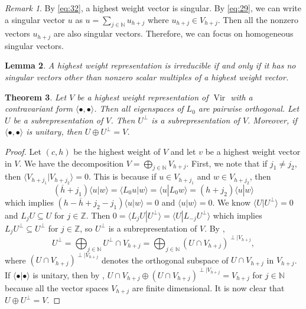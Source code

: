 \documentclass[a4paper, 12pt, reqno]{amsart}
\newtheorem{theorem}{Theorem}[subsection]
\newtheorem{lemma}[theorem]{Lemma}
\theoremstyle{remark}
\newtheorem{remark}[theorem]{Remark}
\numberwithin{equation}{subsection}
\DeclareMathOperator{\Vir}{Vir}
\begin{document}
\begin{remark}
  \label{rmk:22}
  By \eqref{eq:32}, a highest weight vector is singular. 
  By \eqref{eq:29}, we can  write a singular vector $u$ as $u = \sum_{j \in \mathbb{N}}u_{h + j}$ where $u_{h + j} \in V_{h + j}$.
  Then all the nonzero vectors $u_{h + j}$ are also singular vectors.
  Therefore, we can focus on homogeneous singular vectors.
\end{remark}

\begin{lemma}
  \label{lmm:11}
  A highest weight representation is irreducible if and only if it has no singular vectors other than nonzero scalar multiples of a highest weight vector.
\end{lemma}

\begin{theorem}
  \label{thr:24}
  Let $V$ be a highest weight representation of $\Vir$ with a contravariant form $\langle \bullet, \bullet\rangle$.
  Then all eigenspaces of $L_0$ are pairwise orthogonal.
  Let $U$ be a subrepresentation of $V$.
  Then $U^\perp$ is a subrepresentation of $V$.
  Moreover, if $\langle \bullet, \bullet\rangle$ is unitary, then $U\oplus U^\perp=V$.
\end{theorem}

\begin{proof}
  Let $(c, h)$ be the highest weight of $V$ and let $v$ be a highest weight vector in $V$.
  We have the decomposition $V = \bigoplus_{j \in \mathbb{N}}V_{h + j}$.
  First, we note that if $j_1 \neq j_2$, then $\langle V_{h + j_1}| V_{h + j_2}\rangle = 0$.
  This is because if $u \in V_{h + j_1}$ and $w \in V_{h + j_2}$, then
  \begin{equation*}
    (\overline{h} + j_1)\langle u| w\rangle = \langle L_0u| w\rangle = \langle u| L_0w\rangle = (h + j_2)\langle u| w\rangle
  \end{equation*}
  which implies $(h - \overline{h} + j_2 - j_1)\langle u| w\rangle = 0$ and $\langle u| w\rangle = 0$.
  We know $\langle U| U^{\perp}\rangle = 0$ and $L_jU \subseteq U$ for $j \in \mathbb{Z}$.
  Then $0 = \langle L_jU| U^{\perp}\rangle = \langle U| L_{-j}U^{\perp}\rangle$ which implies $L_jU^{\perp} \subseteq U^{\perp}$ for $j \in \mathbb{Z}$, so $U^{\perp}$ is a subrepresentation of $V$.
  By ,
  \begin{equation*}
     U^{\perp} = \bigoplus_{j \in \mathbb{N}}U^{\perp} \cap V_{h + j} = \bigoplus_{j \in \mathbb{N}}(U \cap V_{h + j})^{\perp|V_{h + j}},
  \end{equation*}
  where $(U \cap V_{h + j})^{\perp|V_{h + j}}$ denotes the orthogonal subspace of $U \cap V_{h + j}$ in $V_{h + j}$.
  If $\langle \bullet| \bullet\rangle$ is unitary, then by , $U \cap V_{h + j} \oplus (U \cap V_{h + j})^{\perp|V_{h + j}} = V_{h + j}$ for $j \in \mathbb{N}$ because all the vector spaces $V_{h + j}$ are finite dimensional.
  It is now clear that $U \oplus U^{\perp} = V$.
\end{proof}
\end{document}
